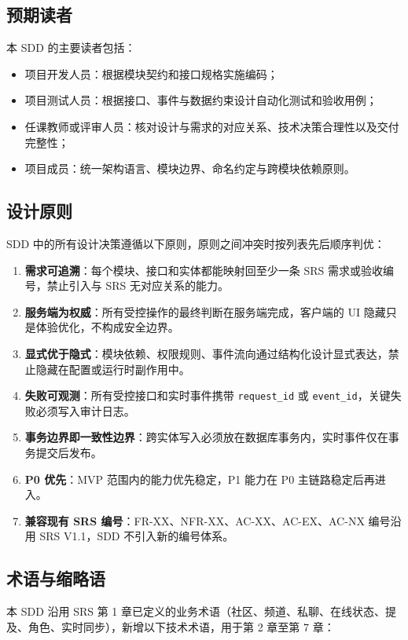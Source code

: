 \subsection{预期读者}
本 SDD 的主要读者包括：

\begin{itemize}
  \item 项目开发人员：根据模块契约和接口规格实施编码；
  \item 项目测试人员：根据接口、事件与数据约束设计自动化测试和验收用例；
  \item 任课教师或评审人员：核对设计与需求的对应关系、技术决策合理性以及交付完整性；
  \item 项目成员：统一架构语言、模块边界、命名约定与跨模块依赖原则。
\end{itemize}

\subsection{设计原则}
SDD 中的所有设计决策遵循以下原则，原则之间冲突时按列表先后顺序判优：

\begin{enumerate}
  \item \textbf{需求可追溯}：每个模块、接口和实体都能映射回至少一条 SRS 需求或验收编号，禁止引入与 SRS 无对应关系的能力。
  \item \textbf{服务端为权威}：所有受控操作的最终判断在服务端完成，客户端的 UI 隐藏只是体验优化，不构成安全边界。
  \item \textbf{显式优于隐式}：模块依赖、权限规则、事件流向通过结构化设计显式表达，禁止隐藏在配置或运行时副作用中。
  \item \textbf{失败可观测}：所有受控接口和实时事件携带 \texttt{request\_id} 或 \texttt{event\_id}，关键失败必须写入审计日志。
  \item \textbf{事务边界即一致性边界}：跨实体写入必须放在数据库事务内，实时事件仅在事务提交后发布。
  \item \textbf{P0 优先}：MVP 范围内的能力优先稳定，P1 能力在 P0 主链路稳定后再进入。
  \item \textbf{兼容现有 SRS 编号}：FR-XX、NFR-XX、AC-XX、AC-EX、AC-NX 编号沿用 SRS V1.1，SDD 不引入新的编号体系。
\end{enumerate}

\subsection{术语与缩略语}
本 SDD 沿用 SRS 第 1 章已定义的业务术语（社区、频道、私聊、在线状态、提及、角色、实时同步），新增以下技术术语，用于第 2 章至第 7 章：


